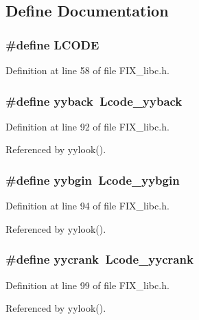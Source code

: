 \subsection{Define Documentation}
\subsubsection{\setlength{\rightskip}{0pt plus 5cm}\#define LCODE}\label{FIX__libc_8h_3e21894314cb211d8eb1037a1e91fc60}




Definition at line 58 of file FIX\_\-libc.h.
\subsubsection{\setlength{\rightskip}{0pt plus 5cm}\#define yyback~Lcode\_\-yyback}\label{FIX__libc_8h_c78f1e6f871c401a0ba5c0550b9490dd}




Definition at line 92 of file FIX\_\-libc.h.

Referenced by yylook().
\subsubsection{\setlength{\rightskip}{0pt plus 5cm}\#define \bf{yybgin}~Lcode\_\-yybgin}\label{FIX__libc_8h_f8bda85b061fed32e7319b181de70607}




Definition at line 94 of file FIX\_\-libc.h.

Referenced by yylook().
\subsubsection{\setlength{\rightskip}{0pt plus 5cm}\#define \bf{yycrank}~Lcode\_\-yycrank}\label{FIX__libc_8h_a983bbc3757e6ff6025f5c357148a0cf}




Definition at line 99 of file FIX\_\-libc.h.

Referenced by yylook().
